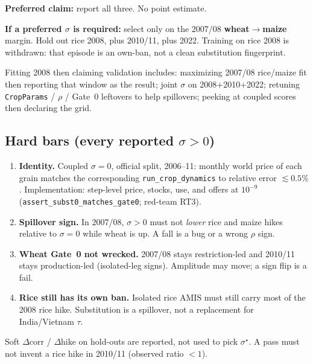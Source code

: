 \textbf{Preferred claim:} report all three. No point estimate.

\textbf{If a preferred \(\sigma\) is required:} select only on the 2007/08
\textbf{wheat\(\to\)maize} margin. Hold out rice 2008, plus 2010/11, plus
2022. Training on rice 2008 is withdrawn: that episode is an own-ban, not
a clean substitution fingerprint.

Fitting 2008 then claiming validation includes: maximizing 2007/08
rice/maize fit then reporting that window as the result; joint \(\sigma\)
on 2008+2010+2022; retuning \texttt{CropParams} / \(\rho\) / Gate~0
leftovers to help spillovers; peeking at coupled scores then declaring the
grid.

\subsection{Hard bars (every reported \(\sigma>0\))}

\begin{enumerate}
\item \textbf{Identity.} Coupled \(\sigma=0\), official split, 2006--11:
      monthly world price of each grain matches the corresponding
      \texttt{run\_crop\_dynamics} to relative error \(\lesssim 0.5\%\).
      Implementation: step-level price, stocks, use, and offers at
      \(10^{-9}\) (\texttt{assert\_subst0\_matches\_gate0}; red-team RT3).
\item \textbf{Spillover sign.} In 2007/08, \(\sigma>0\) must not
      \emph{lower} rice and maize hikes relative to \(\sigma=0\) while
      wheat is up. A fall is a bug or a wrong \(\rho\) sign.
\item \textbf{Wheat Gate~0 not wrecked.} 2007/08 stays restriction-led and
      2010/11 stays production-led (isolated-leg signs). Amplitude may
      move; a sign flip is a fail.
\item \textbf{Rice still has its own ban.} Isolated rice AMIS must still
      carry most of the 2008 rice hike. Substitution is a spillover, not a
      replacement for India/Vietnam \(\tau\).
\end{enumerate}

Soft \(\Delta\)corr / \(\Delta\)hike on hold-outs are reported, not used
to pick \(\sigma^\star\). A pass must not invent a rice hike in 2010/11
(observed ratio \(<1\)).
